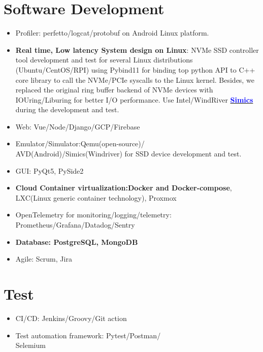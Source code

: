 \vspace{-8em}
\section*{Software Development}\label{software-dev}
\begin{theorembox}
\begin{itemize}[noitemsep]
    \item Profiler: perfetto/logcat/protobuf on Android Linux platform.
    \item \textbf{Real time, Low latency System design on Linux}: NVMe SSD controller tool development and test 
    for several Linux distributions (Ubuntu/CentOS/RPI) using Pybind11 
    for binding top python API to C++ core library to call the NVMe/PCIe syscalls to the Linux kernel.
    Besides, we replaced the original ring buffer backend of  NVMe devices with IOUring/Liburing 
    for better I/O performance. Use Intel/WindRiver \href{https://www.windriver.com/products/simics}{\textbf{\textcolor{blue}{Simics}}} during the development and test.
    \item Web: Vue/Node/Django/GCP/Firebase
    \item Emulator/Simulator:Qemu(open-source)/\\AVD(Android)/Simics(Windriver) for SSD device development and test.
    \item GUI: PyQt5, PySide2
    \item \textbf{Cloud Container virtualization:Docker and Docker-compose}, LXC(Linux generic container technology), Proxmox
    \item OpenTelemetry for monitoring/logging/telemetry:\\ Prometheus/Grafana/Datadog/Sentry
    \item \textbf{Database: PostgreSQL, MongoDB}
    \item Agile: Scrum, Jira
\end{itemize}
\end{theorembox}

\vspace{-10em}

\section*{Test}
\begin{examplebox}
\begin{itemize}[noitemsep]
    \item CI/CD: Jenkins/Groovy/Git action
    \item Test automation framework: Pytest/Postman/\\Selemium
\end{itemize}
\end{examplebox}

